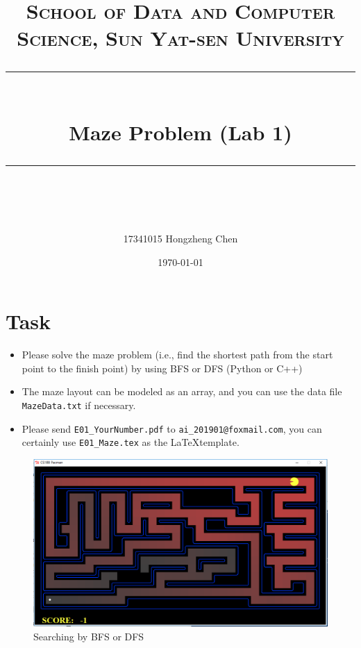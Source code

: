 \documentclass[a4paper, 11pt]{article}
\title{	
\normalfont \normalsize
\textsc{School of Data and Computer Science, Sun Yat-sen University} \\ [25pt] %
\rule{\textwidth}{0.5pt} \\[0.4cm] %
\huge  Maze Problem (Lab 1)\\ %
\rule{\textwidth}{2pt} \\[0.5cm] %
\author{17341015 Hongzheng Chen}
\date{\normalsize\today}
}
\begin{document}
\maketitle
\tableofcontents
\newpage
\section{Task}

\begin{itemize}
	\item Please solve the maze problem (i.e., find the shortest path from the start point to the finish point) by using BFS or DFS (Python or C++)
	\item The maze layout can be modeled as an array, and you can use the data file \texttt{MazeData.txt} if necessary.
	\item Please send \texttt{E01\_YourNumber.pdf} to \texttt{ai\_201901@foxmail.com}, you can certainly use \texttt{E01\_Maze.tex} as the \LaTeX template.
\end{itemize}

\begin{figure}[ht]
\centering
\includegraphics[width=15cm]{fig/Pacman}
\caption{Searching by BFS or DFS}
\end{figure}
\end{document}
